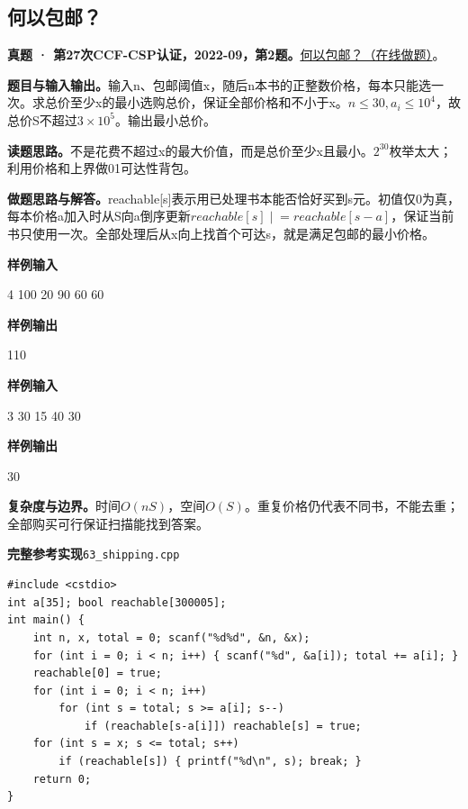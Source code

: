 \documentclass[UTF8,11pt,a4paper,fontset=none]{ctexart}
\begin{document}
\subsection{何以包邮？}
\textbf{真题 · 第27次CCF-CSP认证，2022-09，第2题。}\href{https://www.acwing.com/problem/content/4703/}{何以包邮？（在线做题）}。

\noindent\textbf{题目与输入输出。}输入n、包邮阈值x，随后n本书的正整数价格，每本只能选一次。求总价至少x的最小选购总价，保证全部价格和不小于x。$n\le30,a_i\le10^4$，故总价S不超过$3\times10^5$。输出最小总价。

\noindent\textbf{读题思路。}不是花费不超过x的最大价值，而是总价至少x且最小。$2^{30}$枚举太大；利用价格和上界做01可达性背包。

\noindent\textbf{做题思路与解答。}reachable[s]表示用已处理书本能否恰好买到s元。初值仅0为真，每本价格a加入时从S向a倒序更新$reachable[s]\mathrel{|}=reachable[s-a]$，保证当前书只使用一次。全部处理后从x向上找首个可达s，就是满足包邮的最小价格。
\begin{tcolorbox}[samplebox,title={输入输出样例}]
\textbf{样例输入}
\begin{Sample}
4 100
20
90
60
60
\end{Sample}
\tcblower
\textbf{样例输出}
\begin{Sample}
110
\end{Sample}
\end{tcolorbox}
\begin{tcolorbox}[samplebox,title={输入输出样例}]
\textbf{样例输入}
\begin{Sample}
3 30
15
40
30
\end{Sample}
\tcblower
\textbf{样例输出}
\begin{Sample}
30
\end{Sample}
\end{tcolorbox}

\noindent\textbf{复杂度与边界。}时间$O(nS)$，空间$O(S)$。重复价格仍代表不同书，不能去重；全部购买可行保证扫描能找到答案。
\par\noindent\begin{minipage}{\linewidth}
\textbf{完整参考实现}\quad\texttt{63\_shipping.cpp}
\begin{lstlisting}
#include <cstdio>
int a[35]; bool reachable[300005];
int main() {
    int n, x, total = 0; scanf("%d%d", &n, &x);
    for (int i = 0; i < n; i++) { scanf("%d", &a[i]); total += a[i]; }
    reachable[0] = true;
    for (int i = 0; i < n; i++)
        for (int s = total; s >= a[i]; s--)
            if (reachable[s-a[i]]) reachable[s] = true;
    for (int s = x; s <= total; s++)
        if (reachable[s]) { printf("%d\n", s); break; }
    return 0;
}
\end{lstlisting}
\end{minipage}\par
\end{document}
